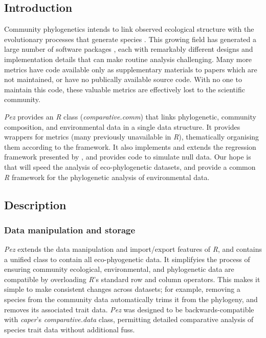\documentclass[11pt]{article} %
\begin{document}
\subsection*{Introduction}
Community phylogenetics intends to link observed ecological structure
with the evolutionary processes that generate species
\autocite[see][]{Webb2002,Cavender-Bares2009}. This growing field has
generated a large number of software packages
\autocite[notably][]{Webb2008,Regetz2009,Kembel2010,Orme2013,Eastman2013},
each with remarkably different designs and implementation details that
can make routine analysis challenging. Many more metrics have code
available only as supplementary materials to papers which are not
maintained, or have no publically available source code. With no one
to maintain this code, these valuable metrics are effectively lost to
the scientific community.

\emph{Pez} provides an \emph{R} class (\emph{comparative.comm}) that
links phylogenetic, community composition, and environmental data in a
single data structure. It provides wrappers for metrics (many
previously unavailable in \emph{R}), thematically organising them
according to the \textcite{Pearse2014review} framework. It also
implements and extends the regression framework presented
by \parencite{Cavender-Bares2004} \autocite[see
also][]{Cavender-Bares2006}, and provides code to simulate null
data. Our hope is that will speed the analysis of eco-phylogenetic
datasets, and provide a common \emph{R} framework for the phylogenetic
analysis of environmental data.
\subsection*{Description}
\subsubsection*{Data manipulation and storage}
\emph{Pez} extends the data manipulation and import/export features of
\emph{R}, and contains a unified class to contain all eco-phyogenetic
data. It simplifyies the process of ensuring community ecological,
environmental, and phylogenetic data are compatible by overloading
\emph{R}'s standard row and column operators. This makes it simple to
make consistent changes across datasets; for example, removing a
species from the community data automatically trims it from the
phylogeny, and removes its associated trait data. \emph{Pez} was
designed to be backwards-compatible with \emph{caper}'s
\autocite{Orme2013} \emph{comparative.data} class, permitting detailed
comparative analysis of species trait data without additional fuss.
\end{document}
